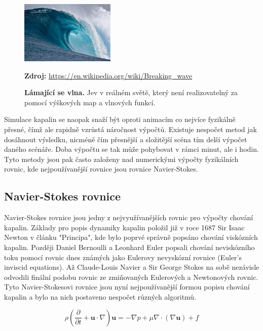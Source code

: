 \begin{figure}[hbt]
	\centering
	\captionsetup{justification=centering}
	\includegraphics[width=0.4\textwidth]{obrazky-figures/Large_breaking_wave.jpg}
	\caption{\textbf{Lámající se vlna.} Jev v reálném světě, který není realizovatelný za pomocí výškových map a vlnových funkcí.}
	\textbf{Zdroj: } \url{https://en.wikipedia.org/wiki/Breaking_wave}
	\label{keepCalm}
\end{figure}

Simulace kapalin se naopak snaží být oproti animacím co nejvíce fyzikálně přesné, čímž ale rapidně vzrůstá náročnost výpočtů. Existuje nespočet metod jak dosáhnout výsledku, nicméně čím přesnější a složitější scéna tím delší výpočet daného scénáře. Doba výpočtu se tak může pohybovat v rámci minut, ale i hodin. Tyto metody jsou pak často založeny nad numerickými výpočty fyzikálních rovnic, kde nejpoužívanější rovnice jsou rovnice Navier-Stokes.

\subsection{Navier-Stokes rovnice}
Navier-Stokes rovnice jsou jedny z nejvyužívanějších rovnic pro výpočty chování kapalin. Základy pro popis dynamiky kapalin položil již v roce 1687 Sir Isaac Newton v článku "Principa", kde bylo poprvé správně popsáno chování viskózních kapalin. Později Daniel Bernoulli a Leonhard Euler popsali chování neviskózního toku pomocí rovnic dnes známých jako Eulerovy nevyskózní rovnice (Euler’s inviscid equations). Až Claude-Louis Navier a Sir George Stokes na sobě nezávisle odvodili finální podobu rovnic ze zmiňovaných Eulerových a Newtonových rovnic. Tyto Navier-Stokesovi rovnice jsou nyní nejpoužívanější formou popisu chování kapalin a bylo na nich postaveno nespočet různých algoritmů. \cite{simscale_2020}

\begin{equation}
	\rho(\frac{\partial}{\partial t} + \mathbf{u} \cdot \nabla)\mathbf{u} = -\nabla p + \mu\nabla\cdot(\nabla \mathbf{u}) + f 
	\label{eq:NavierStokes}
\end{equation}

